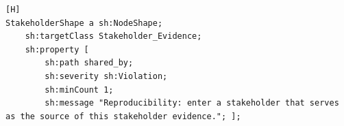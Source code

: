 \begin{lstlisting}[float,language=SHACL,caption={The SHACL code that detects when a stakeholder does not share $Stakeholder\_Evidence$. We use the cardinality constraint $sh:minCount$ for this detection: each individual classified as $Stakeholder\_Evidence$ should have at least one path $shared\_by$. The range of $shared\_by$ is $Stakeholder$.},label={SHACL_REP_SH}][H]
StakeholderShape a sh:NodeShape;
	sh:targetClass Stakeholder_Evidence; 
	sh:property [
		sh:path shared_by;
		sh:severity sh:Violation; 
		sh:minCount 1; 
		sh:message "Reproducibility: enter a stakeholder that serves as the source of this stakeholder evidence."; ];
\end{lstlisting}